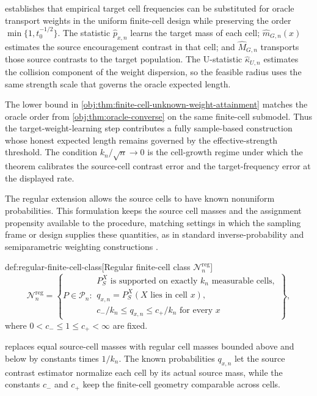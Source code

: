\documentclass[11pt]{article}
\begin{document}
 establishes that empirical target cell frequencies can be substituted for oracle transport weights in the uniform finite-cell design while preserving the order \(\min\{1,t_0^{-1/2}\}\). The statistic \(\widehat p_{x,n}\) learns the target mass of each cell; \(\widehat m_{G,n}(x)\) estimates the source encouragement contrast in that cell; and \(\widehat M_{G,n}\) transports those source contrasts to the target population. The U-statistic \(\widehat\kappa_{U,n}\) estimates the collision component of the weight dispersion, so the feasible radius uses the same strength scale that governs the oracle expected length.

The lower bound in \cref{obj:thm:finite-cell-unknown-weight-attainment} matches the oracle order from \cref{obj:thm:oracle-converse} on the same finite-cell submodel. Thus the target-weight-learning step contributes a fully sample-based construction whose honest expected length remains governed by the effective-strength threshold. The condition \(k_n/\sqrt n\to0\) is the cell-growth regime under which the theorem calibrates the source-cell contrast error and the target-frequency error at the displayed rate.

The regular extension allows the source cells to have known nonuniform probabilities. This formulation keeps the source cell masses and the assignment propensity available to the procedure, matching settings in which the sampling frame or design supplies these quantities, as in standard inverse-probability and semiparametric weighting constructions \citep{HiranoImbensRidder2003,RobinsRotnitzkyZhao1994,VanDerLaanRubin2006,Chernozhukov2018}.

\begin{definitionv}{def:regular-finite-cell-class}[Regular finite-cell class \(\mathcal N_n^{\mathrm{reg}}\)]
\[
\mathcal N_n^{\mathrm{reg}}
=
\left\{
P\in\mathcal P_n:
\begin{array}{l}
P_S^X \text{ is supported on exactly } k_n \text{ measurable cells},\\
q_{x,n}=P_S^X(X \text{ lies in cell } x),\\
c_-/k_n\le q_{x,n}\le c_+/k_n \text{ for every } x
\end{array}
\right\},
\]
where \(0<c_-\le 1\le c_+<\infty\) are fixed.
\end{definitionv}

 replaces equal source-cell masses with regular cell masses bounded above and below by constants times \(1/k_n\). The known probabilities \(q_{x,n}\) let the source contrast estimator normalize each cell by its actual source mass, while the constants \(c_-\) and \(c_+\) keep the finite-cell geometry comparable across cells.
\end{document}
